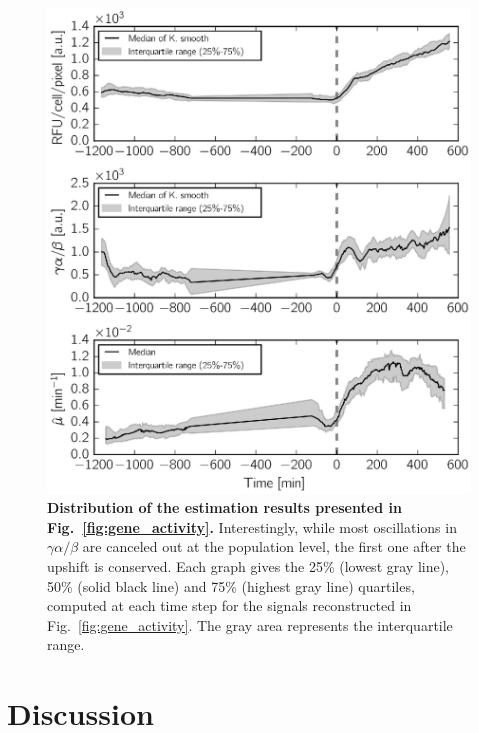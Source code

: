 \begin{figure}[p]
\centering
\includegraphics[scale=1]{./Fig/gene_activity_median}
\caption{
\textbf{Distribution of the estimation results presented in Fig.~\ref{fig:gene_activity}.}
Interestingly, while most oscillations in $\gamma \alpha / \beta$ are canceled out at the population level, the first one after the upshift is conserved.
Each graph gives the 25\% (lowest gray line), 50\% (solid black line) and 75\% (highest gray line) quartiles, computed at each time step for the signals reconstructed in Fig.~\ref{fig:gene_activity}.
The gray area represents the interquartile range.
}
\label{fig:gene_activity_median}
\end{figure}

\section{Discussion}
\label{sec:chap3_discussion}

